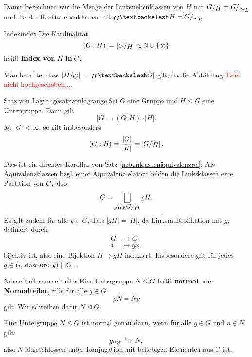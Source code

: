 Damit bezeichnen wir die Menge der Linksnebenklassen von $H$ mit $\quotient{G}{H} = \quotient{G}{\sim_L}$ und die der Rechtsnebenklassen mit $\invquotient{G}{H} = \quotient{G}{\sim_R}$.
\begin{definition}{Index}{index}
Die Kardinalität
\begin{equation}
(G : H) := \left| \quotient{G}{H} \right| \in \N \cup \{\infty\}
\end{equation}
heißt \textbf{Index von} $H$ \textbf{in} $G$.
\end{definition}
Man beachte, dass $\left| \quotient{H}{G} \right| = \left| \invquotient{H}{G} \right|$ gilt, da die Abbildung \textcolor{red}{Tafel nicht hochgeschoben...}.
\begin{theorem}{Satz von Lagrange}{satzvonlagrange}
Sei $G$ eine Gruppe und $H \leq G$ eine Untergruppe. Dann gilt 
\begin{equation}
|G| = (G : H) \cdot |H|.
\end{equation}
Ist $|G| < \infty$, so gilt insbesonders
\begin{equation}
(G : H) = \frac{|G|}{|H|} = \left| \quotient{G}{H} \right|.
\end{equation}
\end{theorem}
\begin{beweis}
Dies ist ein direktes Korollar von Satz \ref{nebenklassenäquivalenzrel}: Als Äquivalenzklassen bzgl. einer Äquivalenzrelation bilden die Linksklassen eine Partition von $G$, also 
\begin{equation}
G = \bigsqcup_{gH \in \quotient{G}{H}} gH.
\end{equation}
Es gilt zudem für alle $g \in G$, dass $|gH| = |H|$, da Linksmultiplikation mit $g$, definiert durch 
\begin{align}
G &\to G\\
x &\mapsto gx,
\end{align}
bijektiv ist, also eine Bijektion $H \to gH$ induziert. Insbesondere gilt für jedes $g \in G$, dass $\operatorname{\text{ord}} (g) \mid |G|$.
\end{beweis}
\begin{definition}{Normalteiler}{normalteiler}
Eine Untergruppe $N \leq G$ heißt \textbf{normal} oder \textbf{Normalteiler}, falls für alle $g \in G$ 
\begin{equation}
gN = Ng
\end{equation}
gilt. Wir schreiben dafür $N \trianglelefteq G$.
\end{definition}
\begin{bemerkung}
Eine Untergruppe $N \leq G$ ist normal genau dann, wenn für alle $g \in G$ und $n \in N$ gilt:
\begin{equation}
gng^{-1} \in N,
\end{equation}
also $N$ abgeschlossen unter Konjugation mit beliebigen Elementen aus $G$ ist.
\end{bemerkung}
